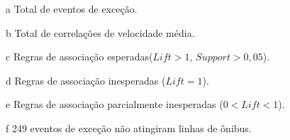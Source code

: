 \documentclass[
	12pt,				%
	oneside,			%
	a4paper,			%
	english,			%
	brazil				%
	]{abntex2ppgsi}
\begin{document}
{{\begin{apendicesenv}
\begin{table}[!htb]
\begin{threeparttable}
\begin{tablenotes}
            \item[a] Total de eventos de exceção.
            \item[b] Total de correlações de velocidade média.
            \item[c] Regras de associação esperadas($Lift > 1$, $Support > 0,05$).
            \item[d] Regras de associação inesperadas ($Lift = 1$).
            \item[e] Regras de associação parcialmente inesperadas ($0 < Lift < 1$).
            \item[f] 249 eventos de exceção não atingiram linhas de ônibus. 
        \end{tablenotes}
\end{threeparttable}
\end{table}


\end{apendicesenv}}}
\end{document}
